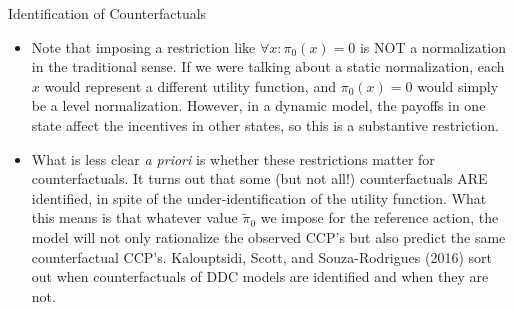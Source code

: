 \documentclass[xcolor=pdftex,dvipsnames,table,mathserif]{beamer}
\begin{document}

\begin{frame}{Identification of Counterfactuals}
\begin{itemize}
\item Note that imposing a restriction like $\forall x:\pi_{0}\left(x\right)=0$
is NOT a normalization in the traditional sense. If we were talking
about a static normalization, each $x$ would represent a different
utility function, and $\pi_{0}\left(x\right)=0$ would simply be a
level normalization. However, in a dynamic model, the payoffs in one
state affect the incentives in other states, so this is a substantive
restriction.

\medskip
\item What is less clear \emph{a priori} is whether these restrictions matter for counterfactuals.
It turns out that some (but not all!) counterfactuals ARE identified, in spite of the
under-identification of the utility function. What this means is that whatever value
$\widetilde{\pi}_{0}$ we impose for the reference action, the model will not only
rationalize the observed CCP's but also predict the same counterfactual CCP's.
Kalouptsidi, Scott, and Souza-Rodrigues (2016) sort out when counterfactuals
of DDC models are identified and when they are not.
\end{itemize}
\end{frame}
\end{document}
